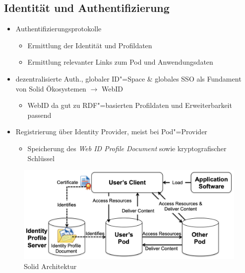 

\subsection{Identität und Authentifizierung}

\begin{itemize}
    \item Authentifizierungsprotokolle
    \begin{itemize}
        \item Ermittlung der Identität und Profildaten
        \item Ermittlung relevanter Links zum Pod und Anwendungsdaten~\cite{sambraSolidPlatformDecentralized2016}
    \end{itemize}
    \item dezentralisierte Auth., globaler ID"=Space \& globales SSO als Fundament von Solid Ökosystemen $\to$ WebID~\cite{sambraSolidPlatformDecentralized2016}
    \begin{itemize}
        \item WebID da gut zu RDF"=basierten Profildaten und Erweiterbarkeit passend~\cite{sambraSolidPlatformDecentralized2016}
    \end{itemize}

    \item Registrierung über Identity Provider, meist bei Pod"=Provider~\cite{sambraSolidPlatformDecentralized2016}
    \begin{itemize}
        \item Speicherung des \emph{Web ID Profile Document} sowie kryptografischer Schlüssel
    \end{itemize}
\end{itemize}

\begin{figure}
    \includegraphics[width=\textwidth]{../shared/assets/sambra_solid_architecture.png}
    \caption{Solid Architektur~\cite{sambraSolidPlatformDecentralized2016}}
\end{figure}

